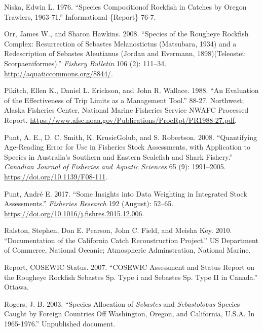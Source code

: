 \documentclass[
]{scrartcl}
\newlength{\cslhangindent}
\newenvironment{CSLReferences}[2] %
 {\begin{list}{}{%
  \setlength{\itemindent}{0pt}
  \setlength{\leftmargin}{0pt}
  \setlength{\parsep}{0pt}
  \ifodd #1
   \setlength{\leftmargin}{\cslhangindent}
   \setlength{\itemindent}{-1\cslhangindent}
  \fi
  \setlength{\itemsep}{#2\baselineskip}}}
 {\end{list}}
\begin{document}
\begin{CSLReferences}{1}{0}
Niska, Edwin L. 1976. {``Species {Compositionof} Rockfish in Catches by
{Oregon} {Trawlers}, 1963-71.''} Informational \{Report\} 76-7.

Orr, James W., and Sharon Hawkins. 2008. {``Species of the Rougheye
Rockfish Complex: Resurrection of {Sebastes} Melanostictus ({Matsubara},
1934) and a Redescription of {Sebastes} Aleutianus ({Jordan} and
{Evermann}, 1898)({Teleostei}: {Scorpaeniformes}).''} \emph{Fishery
Bulletin} 106 (2): 111--34. \url{http://aquaticcommons.org/8844/}.

Pikitch, Ellen K., Daniel L. Erickson, and John R. Wallace. 1988. {``An
Evaluation of the Effectiveness of Trip Limits as a Management Tool.''}
88-27. Northwest; Alaska Fisheries Center, National Marine Fisheries
Service NWAFC Processed Report.
\url{https://www.afsc.noaa.gov/Publications/ProcRpt/PR1988-27.pdf}.

Punt, A. E., D. C. Smith, K. KrusicGolub, and S. Robertson. 2008.
{``Quantifying Age-Reading Error for Use in Fisheries Stock Assessments,
with Application to Species in {A}ustralia's Southern and Eastern
Scalefish and Shark Fishery.''} \emph{Canadian Journal of Fisheries and
Aquatic Sciences} 65 (9): 1991--2005.
\url{https://doi.org/10.1139/F08-111}.

Punt, André E. 2017. {``Some Insights into Data Weighting in Integrated
Stock Assessments.''} \emph{Fisheries Research} 192 (August): 52--65.
\url{https://doi.org/10.1016/j.fishres.2015.12.006}.

Ralston, Stephen, Don E. Pearson, John C. Field, and Meisha Key. 2010.
{``Documentation of the {California} Catch Reconstruction Project.''} US
Department of Commerce, National Oceanic; Atmospheric Adminstration,
National Marine.

Report, COSEWIC Status. 2007. {``COSEWIC Assessment and Status Report on
the Rougheye Rockfish Sebastes Sp. Type i and Sebastes Sp. Type II in
Canada.''} Ottawa.

Rogers, J. B. 2003. {``Species Allocation of \emph{Sebastes} and
\emph{Sebastolobus} Species Caught by Foreign Countries Off
{Washington}, {Oregon}, and {California}, {U}.{S}.{A}. In 1965-1976.''}
Unpublished document.


\end{CSLReferences}
\end{document}
